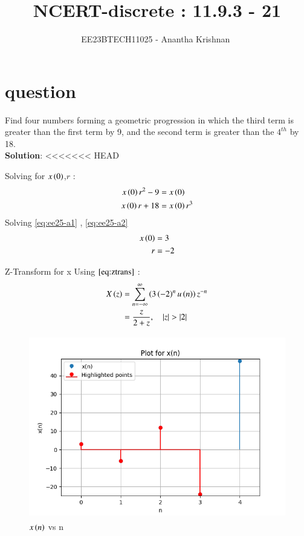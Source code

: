 \documentclass[journal,12pt,onecolumn]{IEEEtran}
\theoremstyle{remark}
\begin{document}

\vspace{3cm}

\title{NCERT-discrete : 11.9.3 - 21}
\author{EE23BTECH11025 - Anantha Krishnan $^{}$%
}
\maketitle
\bigskip

\renewcommand{\thefigure}{\theenumi}
\renewcommand{\thetable}{\theenumi}
\section{question}
Find four numbers forming a geometric progression in which the third term is greater than the first term by 9, and the second term is greater than the $4^{th}$ by 18.\\

\textbf{Solution}:
<<<<<<< HEAD


\begin{enumerate}
    Solving for $x\left(0\right)$,$r$ :
   \begin{align}
x\left(0\right)r^2 - 9 &= x\left(0\right) \label{eq:ee25-a1}\\
x\left(0\right)r + 18 &= x\left(0\right)r^3\label{eq:ee25-a2}
\end{align}
Solving  \eqref{eq:ee25-a1} , \eqref{eq:ee25-a2}
\begin{align}
    x\left(0\right) &= 3\\
    r &= -2
\end{align}

 Z-Transform for x 
    Using $\eqref{eq:ztrans}$ :
    \begin{align}
    X\left(z\right) &= \sum_{n=-\infty}^{\infty}\left(3\left(-2\right)^nu \left(n\right)\right)z^{-n} \\
    &= \frac{z}{2+z} ,\quad \left\vert z\right\vert>\left\vert2\right\vert 
    \end{align}
    
\end{enumerate}
    \begin{figure}[!ht]
    \centering
\graphicspath{ {figs/} }
\includegraphics[width=12cm, height=8cm]{graph_1}
\caption{ $x\left(n\right)$ vs n }
\label{graph:ee25-ag2}
\end{figure}
\end{document}
